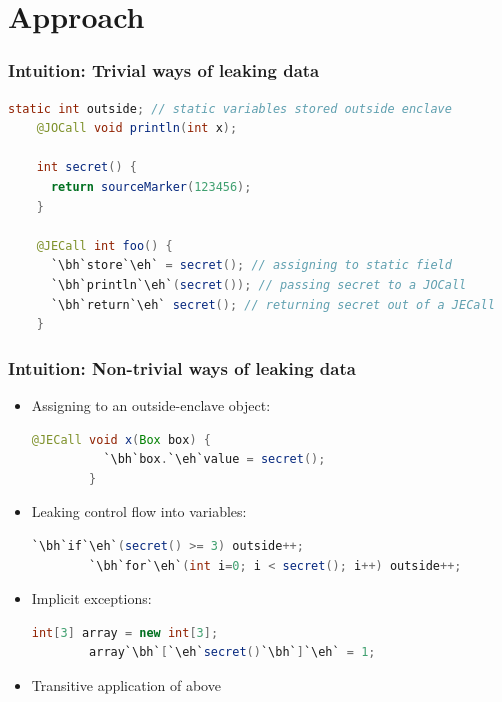\documentclass{beamer}
\newcounter{highlight}[page]
\newcommand{\tikzhighlightanchor}[1]{\ensuremath{\vcenter{\hbox{\tikz[remember picture, overlay]{\coordinate (#1 highlight \arabic{highlight});}}}}}
\newcommand{\bh}[0]{\stepcounter{highlight}\tikzhighlightanchor{begin}}
\newcommand{\eh}[0]{\tikzhighlightanchor{end}}
\begin{document}
\section{Approach}
\begin{frame}[fragile]
  \frametitle{Intuition: Trivial ways of leaking data}
  \begin{lstlisting}[language=java, style=j]
    static int outside; // static variables stored outside enclave
    @JOCall void println(int x);

    int secret() {
      return sourceMarker(123456);
    }

    @JECall int foo() {
      `\bh`store`\eh` = secret(); // assigning to static field
      `\bh`println`\eh`(secret()); // passing secret to a JOCall
      `\bh`return`\eh` secret(); // returning secret out of a JECall
    }
  \end{lstlisting}
\end{frame}

\begin{frame}[fragile]
  \frametitle{Intuition: Non-trivial ways of leaking data}
  \begin{itemize}
    \item Assigning to an outside-enclave object:
      \begin{lstlisting}[language=java, style=j, gobble=8, tabsize=2]
        @JECall void x(Box box) {
          `\bh`box.`\eh`value = secret();
        }
      \end{lstlisting}
    \item Leaking control flow into variables:
      \begin{lstlisting}[language=java, style=j, gobble=8, tabsize=2]
        `\bh`if`\eh`(secret() >= 3) outside++;
        `\bh`for`\eh`(int i=0; i < secret(); i++) outside++;
      \end{lstlisting}
    \item Implicit exceptions:\\
      \begin{lstlisting}[language=java, style=j, gobble=8, tabsize=2]
        int[3] array = new int[3];
        array`\bh`[`\eh`secret()`\bh`]`\eh` = 1;
      \end{lstlisting}
    \item Transitive application of above
  \end{itemize}
\end{frame}
\end{document}
